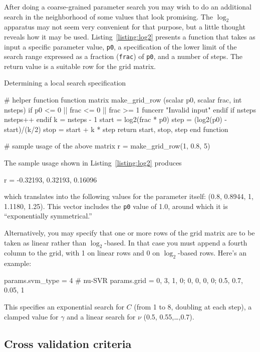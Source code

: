 \documentclass{article}
\begin{document}
After doing a coarse-grained parameter search you may wish to do an
additional search in the neighborhood of some values that look
promising.  The $\log_2$ apparatus may not seem very convenient for
that purpose, but a little thought reveals how it may be
used. Listing~\ref{listing:log2} presents a function that takes as
input a specific parameter value, \texttt{p0}, a specification of the
lower limit of the search range expressed as a fraction
(\texttt{frac}) of \texttt{p0}, and a number of steps. The return
value is a suitable row for the grid matrix.

\begin{script}[htbp]
  \caption{Determining a local search specification}
  \label{listing:log2}
\begin{scode}
# helper function
function matrix make_grid_row (scalar p0, scalar frac, int nsteps)
  if p0 <= 0 || frac <= 0 || frac >= 1
    funcerr "Invalid input"
  endif
  if nsteps %
    nsteps++
  endif
  k = nsteps - 1
  start = log2(frac * p0)
  step = (log2(p0) - start)/(k/2)
  stop = start + k * step
  return {start, stop, step}
end function

# sample usage of the above
matrix r = make_grid_row(1, 0.8, 5)
\end{scode}
\end{script}

The sample usage shown in Listing~\ref{listing:log2} produces
\begin{code}
r = {-0.32193, 0.32193, 0.16096}
\end{code}
which translates into the following values for the parameter itself:
(0.8, 0.8944, 1, 1.1180, 1.25). This vector includes the \texttt{p0}
value of 1.0, around which it is ``exponentially symmetrical.''

Alternatively, you may specify that one or more rows of the grid
matrix are to be taken as linear rather than $\log_2$-based. In that
case you must append a fourth column to the grid, with 1 on linear
rows and 0 on $\log_2$-based rows. Here's an example:
\begin{code}
params.svm_type = 4 # nu-SVR
params.grid = {0, 3, 1, 0; 0, 0, 0, 0; 0.5, 0.7, 0.05, 1}
\end{code}
This specifies an exponential search for $C$ (from 1 to 8, doubling at
each step), a clamped value for $\gamma$ and a linear search for
$\nu$ (0.5, 0.55,\dots,0.7).

\subsection{Cross validation criteria}
\label{sec:regcrit}
\end{document}
